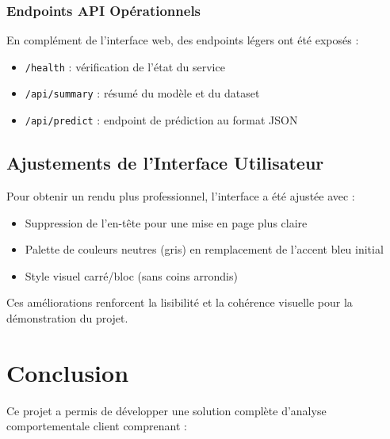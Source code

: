 \documentclass[12pt,a4paper]{article}
\begin{document}
\subsubsection{Endpoints API Opérationnels}
En complément de l'interface web, des endpoints légers ont été exposés :
\begin{itemize}
    \item \texttt{/health} : vérification de l'état du service
    \item \texttt{/api/summary} : résumé du modèle et du dataset
    \item \texttt{/api/predict} : endpoint de prédiction au format JSON
\end{itemize}

\subsection{Ajustements de l'Interface Utilisateur}

Pour obtenir un rendu plus professionnel, l'interface a été ajustée avec :
\begin{itemize}
    \item Suppression de l'en-tête pour une mise en page plus claire
    \item Palette de couleurs neutres (gris) en remplacement de l'accent bleu initial
    \item Style visuel carré/bloc (sans coins arrondis)
\end{itemize}

Ces améliorations renforcent la lisibilité et la cohérence visuelle pour la démonstration du projet.

\section{Conclusion}

Ce projet a permis de développer une solution complète d'analyse comportementale client comprenant :
\end{document}
